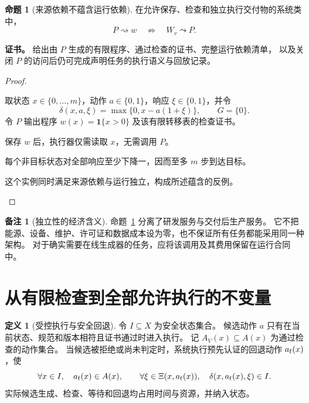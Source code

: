 \documentclass[UTF8,12pt,a4paper,openany,fontset=none,zihao=false]{ctexrep}
\theoremstyle{definition}
\newtheorem{definition}{定义}[chapter]
\newtheorem{proposition}{命题}[chapter]
\newtheorem{remark}{备注}[chapter]
\newenvironment{certificate}{\par\noindent\textbf{证书。}\ignorespaces}{\par}
\newcommand{\1}{\mathbf 1}
\begin{document}
\begin{proposition}[来源依赖不蕴含运行依赖]
\label{tra:provenance}
在允许保存、检查和独立执行交付物的系统类中，
\[
P\rightsquigarrow w\quad\not\Longrightarrow\quad W_v\leadsto P.
\]
\end{proposition}
\begin{certificate}
给出由 \(P\) 生成的有限程序、通过检查的证书、完整运行依赖清单，
以及关闭 \(P\) 的访问后仍可完成声明任务的执行语义与回放记录。
\end{certificate}
\begin{proof}
\begin{semanticsteps}
\item 取状态 \(x\in\{0,\ldots,m\}\)，动作 \(a\in\{0,1\}\)，响应 \(\xi\in\{0,1\}\)，并令
\[
\delta(x,a,\xi)=\max\{0,x-a(1+\xi)\},\qquad G=\{0\}.
\]
令 \(P\) 输出程序 \(w(x)=\mathbf1\{x>0\}\) 及该有限转移表的检查证书。
\item 保存 \(w\) 后，执行器仅需读取 \(x\)，无需调用 \(P\)。
\item 每个非目标状态对全部响应至少下降一，因而至多 \(m\) 步到达目标。
\item 这个实例同时满足来源依赖与运行独立，构成所述蕴含的反例。
\end{semanticsteps}
\end{proof}

\begin{remark}[独立性的经济含义]
命题~\ref{tra:provenance} 分离了研发服务与交付后生产服务。
它不把能源、设备、维护、许可证和数据成本设为零，也不保证所有任务都能采用同一种架构。
对于确实需要在线生成器的任务，应将该调用及其费用保留在运行合同中。
\end{remark}

\section{从有限检查到全部允许执行的不变量}

\begin{definition}[受控执行与安全回退]
\label{tra:guarded}
令 \(I\subseteq X\) 为安全状态集合。
候选动作 \(a\) 只有在当前状态、规范和版本相符且证书通过时进入执行。
记 \(A_V(x)\subseteq A(x)\) 为通过检查的动作集合。
当候选被拒绝或尚未判定时，系统执行预先认证的回退动作 \(a_{\rm f}(x)\)，使
\[
\forall x\in I,\quad a_{\rm f}(x)\in A(x),\qquad
\forall\xi\in\Xi(x,a_{\rm f}(x)),\quad
\delta(x,a_{\rm f}(x),\xi)\in I.
\]
实际候选生成、检查、等待和回退均占用时间与资源，并纳入状态。
\end{definition}
\end{document}
